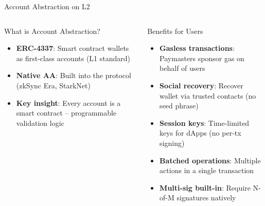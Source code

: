\documentclass[8pt,aspectratio=169]{beamer}
\begin{document}
\begin{frame}{Account Abstraction on L2}
\vspace{-1mm}
\begin{columns}[T]
\begin{block}{What is Account Abstraction?}
\footnotesize
\begin{itemize}\setlength\itemsep{3pt}
  \item \textbf{ERC-4337}: Smart contract wallets as first-class accounts (L1 standard)
  \item \textbf{Native AA}: Built into the protocol (zkSync Era, StarkNet)
  \item \textbf{Key insight}: Every account is a smart contract -- programmable validation logic
\end{itemize}
\end{block}
\vspace{2mm}
\begin{block}{Benefits for Users}
\footnotesize
\begin{itemize}\setlength\itemsep{3pt}
  \item \textbf{Gasless transactions}: Paymasters sponsor gas on behalf of users
  \item \textbf{Social recovery}: Recover wallet via trusted contacts (no seed phrase)
  \item \textbf{Session keys}: Time-limited keys for dApps (no per-tx signing)
  \item \textbf{Batched operations}: Multiple actions in a single transaction
  \item \textbf{Multi-sig built-in}: Require N-of-M signatures natively
\end{itemize}
\end{block}
\vspace{1mm}
\end{columns}
\end{frame}
\end{document}

